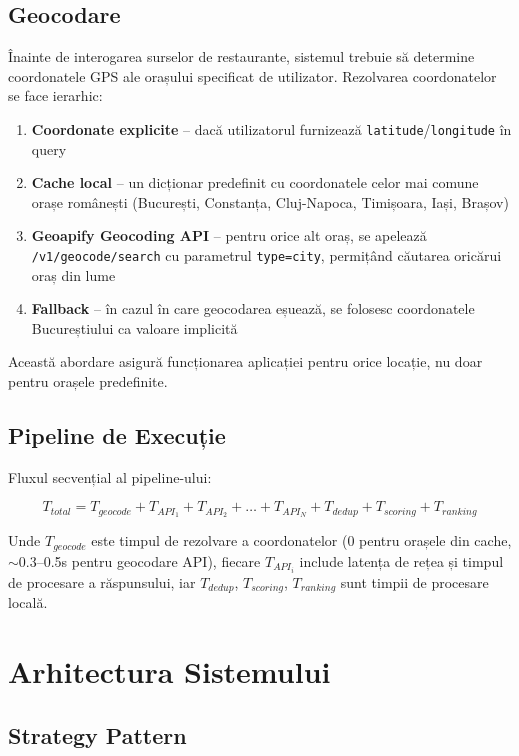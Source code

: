 \documentclass[12pt,a4paper]{article}
\begin{document}
\subsection{Geocodare}

Înainte de interogarea surselor de restaurante, sistemul trebuie să determine coordonatele GPS ale orașului specificat de utilizator. Rezolvarea coordonatelor se face ierarhic:

\begin{enumerate}
    \item \textbf{Coordonate explicite} -- dacă utilizatorul furnizează \texttt{latitude}/\texttt{longitude} în query
    \item \textbf{Cache local} -- un dicționar predefinit cu coordonatele celor mai comune orașe românești (București, Constanța, Cluj-Napoca, Timișoara, Iași, Brașov)
    \item \textbf{Geoapify Geocoding API} -- pentru orice alt oraș, se apelează \texttt{/v1/geocode/search} cu parametrul \texttt{type=city}, permițând căutarea oricărui oraș din lume
    \item \textbf{Fallback} -- în cazul în care geocodarea eșuează, se folosesc coordonatele Bucureștiului ca valoare implicită
\end{enumerate}

Această abordare asigură funcționarea aplicației pentru orice locație, nu doar pentru orașele predefinite.

\subsection{Pipeline de Execuție}

Fluxul secvențial al pipeline-ului:

$$T_{total} = T_{geocode} + T_{API_1} + T_{API_2} + \ldots + T_{API_N} + T_{dedup} + T_{scoring} + T_{ranking}$$

Unde $T_{geocode}$ este timpul de rezolvare a coordonatelor (0 pentru orașele din cache, $\sim$0.3--0.5s pentru geocodare API), fiecare $T_{API_i}$ include latența de rețea și timpul de procesare a răspunsului, iar $T_{dedup}$, $T_{scoring}$, $T_{ranking}$ sunt timpii de procesare locală.

\section{Arhitectura Sistemului}

\subsection{Strategy Pattern}
\end{document}
